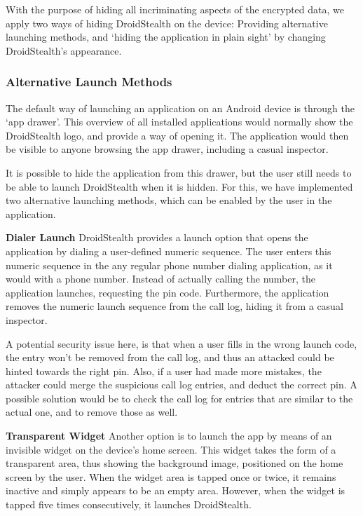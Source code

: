With the purpose of hiding all incriminating aspects of the encrypted data, we apply two ways of hiding DroidStealth on the device: 
Providing alternative launching methods, and `hiding the application in plain sight' by changing DroidStealth's appearance.

\subsubsection{Alternative Launch Methods}
The default way of launching an application on an Android device is through the `app drawer'.
This overview of all installed applications would normally show the DroidStealth logo, and provide a way of opening it.
The application would then be visible to anyone browsing the app drawer, including a casual inspector.

It is possible to hide the application from this drawer, but the user still needs to be able to launch DroidStealth when it is hidden.
For this, we have implemented two alternative launching methods, which can be enabled by the user in the application.

\textbf{Dialer Launch}
DroidStealth provides a launch option that opens the application by dialing a user-defined numeric sequence. 
The user enters this numeric sequence in the any regular phone number dialing application, as it would with a phone number.
Instead of actually calling the number, the application launches, requesting the pin code. 
Furthermore, the application removes the numeric launch sequence from the call log, hiding it from a casual inspector.

A potential security issue here, is that when a user fills in the wrong launch code, the entry won't be removed from the call log, and thus an attacked could be hinted towards the right pin. 
Also, if a user had made more mistakes, the attacker could merge the suspicious call log entries, and deduct the correct pin. 
A possible solution would be to check the call log for entries that are similar to the actual one, and to remove those as well.

\textbf{Transparent Widget}
Another option is to launch the app by means of an invisible widget on the device's home screen. 
This widget takes the form of a transparent area, thus showing the background image, positioned on the home screen by the user.
When the widget area is tapped once or twice, it remains inactive and simply appears to be an empty area.
However, when the widget is tapped five times consecutively, it launches DroidStealth.


